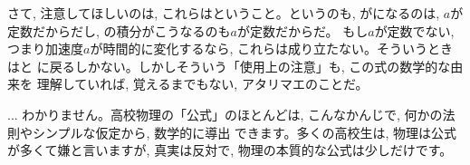 さて, 注意してほしいのは, これらはということ。というのも, 
がになるのは, $a$が定数だからだし, 
の積分がこうなるのも$a$が定数だからだ。
もし$a$が定数でない, つまり加速度$a$が時間的に変化するなら, 
これらは成り立たない。そういうときはと
に戻るしかない。しかしそういう「使用上の注意」も, この式の数学的な由来を
理解していれば, 覚えるまでもない, アタリマエのことだ。

\begin{faq}{\small{} ... わかりません。高校物理の「公式」のほとんどは, 
こんなかんじで, 何かの法則やシンプルな仮定から, 数学的に導出
できます。多くの高校生は, 物理は公式が多くて嫌と言いますが, 
真実は反対で, 物理の本質的な公式は少しだけです。}\end{faq}
\mv

